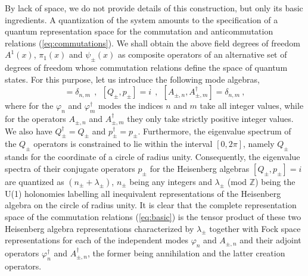\documentclass[a4paper,11pt]{article}
\def\Z{\mathbb Z}
\begin{document}
By lack of space, we do not provide details of this construction,
but only its basic ingredients.\cite{Gaby} A quantization of
the system amounts to the specification of a quantum representation space
for the commutation and anticommutation relations (\ref{eq:commutations}).
We shall obtain the above field degrees of freedom $A^1(x)$, $\pi_1(x)$
and $\psi_\pm(x)$ as composite operators of an alternative set
of degrees of freedom whose commutation relations define the space of
quantum states. For this purpose, let us introduce the following
mode algebras,
\begin{equation}
[\varphi_n,\varphi^\dagger_m]=\delta_{n,m}\ \ ,\ \ 
[Q_\pm,p_\pm]=i\ \ ,\ \ 
[A_{\pm,n},A^\dagger_{\pm,m}]=\delta_{n,m}\ ,
\label{eq:basic}
\end{equation}
where for the $\varphi_n$ and $\varphi^\dagger_m$ modes the indices
$n$ and $m$ take all integer values, while for the operators
$A_{\pm,n}$ and $A^\dagger_{\pm,m}$ they only take strictly
positive integer values. We also have $Q^\dagger_\pm=Q_\pm$ and
$p^\dagger_\pm=p_\pm$. Furthermore, the eigenvalue spectrum of the
$Q_\pm$ operators is constrained to lie within the interval $[0,2\pi]$,
namely $Q_\pm$ stands for the coordinate of a circle of radius unity.
Consequently, the eigenvalue spectra of their conjugate operators $p_\pm$
for the Heisenberg algebras $[Q_\pm,p_\pm]=i$ are quantized as
$(n_\pm+\lambda_\pm)$, $n_\pm$ being any integers and 
$\lambda_\pm$ (mod $\Z$) being the U(1) holonomies labelling all inequivalent
representations of the Heisenberg algebra on the circle of radius 
unity.\cite{Gov6} It is clear that the complete representation space of 
the commutation
relations (\ref{eq:basic}) is the tensor product of these two Heisenberg 
algebra representations characterized by $\lambda_\pm$ together with Fock 
space representations for each of the independent modes $\varphi_n$ and 
$A_{\pm,n}$ and their adjoint operators $\varphi^\dagger_n$ and
$A^\dagger_{\pm,n}$, the former being annihilation and the latter 
creation operators.
\end{document}
